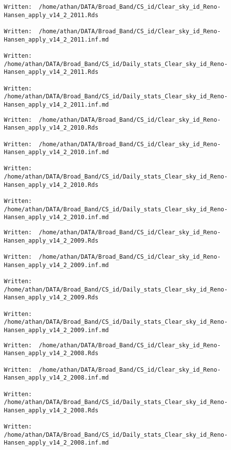 \documentclass[
  10pt,
  a4paper,oneside]{article}
\begin{document}
\begin{verbatim}
Written:  /home/athan/DATA/Broad_Band/CS_id/Clear_sky_id_Reno-Hansen_apply_v14_2_2011.Rds 

Written:  /home/athan/DATA/Broad_Band/CS_id/Clear_sky_id_Reno-Hansen_apply_v14_2_2011.inf.md 

Written:  /home/athan/DATA/Broad_Band/CS_id/Daily_stats_Clear_sky_id_Reno-Hansen_apply_v14_2_2011.Rds 

Written:  /home/athan/DATA/Broad_Band/CS_id/Daily_stats_Clear_sky_id_Reno-Hansen_apply_v14_2_2011.inf.md 
\end{verbatim}

\begin{verbatim}
Written:  /home/athan/DATA/Broad_Band/CS_id/Clear_sky_id_Reno-Hansen_apply_v14_2_2010.Rds 

Written:  /home/athan/DATA/Broad_Band/CS_id/Clear_sky_id_Reno-Hansen_apply_v14_2_2010.inf.md 

Written:  /home/athan/DATA/Broad_Band/CS_id/Daily_stats_Clear_sky_id_Reno-Hansen_apply_v14_2_2010.Rds 

Written:  /home/athan/DATA/Broad_Band/CS_id/Daily_stats_Clear_sky_id_Reno-Hansen_apply_v14_2_2010.inf.md 
\end{verbatim}

\begin{verbatim}
Written:  /home/athan/DATA/Broad_Band/CS_id/Clear_sky_id_Reno-Hansen_apply_v14_2_2009.Rds 

Written:  /home/athan/DATA/Broad_Band/CS_id/Clear_sky_id_Reno-Hansen_apply_v14_2_2009.inf.md 

Written:  /home/athan/DATA/Broad_Band/CS_id/Daily_stats_Clear_sky_id_Reno-Hansen_apply_v14_2_2009.Rds 

Written:  /home/athan/DATA/Broad_Band/CS_id/Daily_stats_Clear_sky_id_Reno-Hansen_apply_v14_2_2009.inf.md 
\end{verbatim}

\begin{verbatim}
Written:  /home/athan/DATA/Broad_Band/CS_id/Clear_sky_id_Reno-Hansen_apply_v14_2_2008.Rds 

Written:  /home/athan/DATA/Broad_Band/CS_id/Clear_sky_id_Reno-Hansen_apply_v14_2_2008.inf.md 

Written:  /home/athan/DATA/Broad_Band/CS_id/Daily_stats_Clear_sky_id_Reno-Hansen_apply_v14_2_2008.Rds 

Written:  /home/athan/DATA/Broad_Band/CS_id/Daily_stats_Clear_sky_id_Reno-Hansen_apply_v14_2_2008.inf.md 
\end{verbatim}
\end{document}
